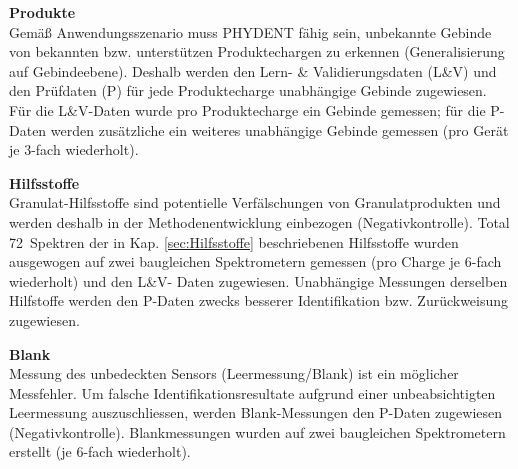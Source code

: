 \documentclass[11pt, a4paper]{article}
\newcommand\NrMatrix{72}
\begin{document}
\textbf{Produkte}\\[1.2pt]
Gemäß Anwendungsszenario muss PHYDENT fähig sein, unbekannte Gebinde von bekannten bzw. unterstützen Produktechargen zu erkennen (Generalisierung auf Gebindeebene). Deshalb werden den Lern- \& Validierungsdaten (L\&V) und den Prüfdaten (P) für jede Produktecharge unabhängige Gebinde zugewiesen. Für die L\&V-Daten wurde pro Produktecharge ein Gebinde gemessen; für die P-Daten werden zusätzliche ein weiteres unabhängige Gebinde gemessen (pro Gerät je 3-fach wiederholt).

\textbf{Hilfsstoffe}\\[1.2pt]
Granulat-Hilfsstoffe sind potentielle Verfälschungen von Granulatprodukten und werden deshalb in der Methodenentwicklung einbezogen (Negativkontrolle). Total \NrMatrix\ Spektren der in Kap. \ref{sec:Hilfsstoffe} beschriebenen Hilfsstoffe wurden ausgewogen auf zwei baugleichen Spektrometern gemessen (pro Charge je 6-fach wiederholt) und den L\&V- Daten zugewiesen. Unabhängige Messungen derselben Hilfstoffe werden den P-Daten zwecks besserer Identifikation bzw. Zurückweisung zugewiesen.

\textbf{Blank}\\[1.2pt]
Messung des unbedeckten Sensors (Leermessung/Blank) ist ein möglicher Messfehler. Um falsche Identifikationsresultate aufgrund einer unbeabsichtigten Leermessung auszuschliessen, werden Blank-Messungen den P-Daten zugewiesen (Negativkontrolle). Blankmessungen wurden auf zwei baugleichen Spektrometern erstellt (je 6-fach wiederholt).
 
\end{document}
